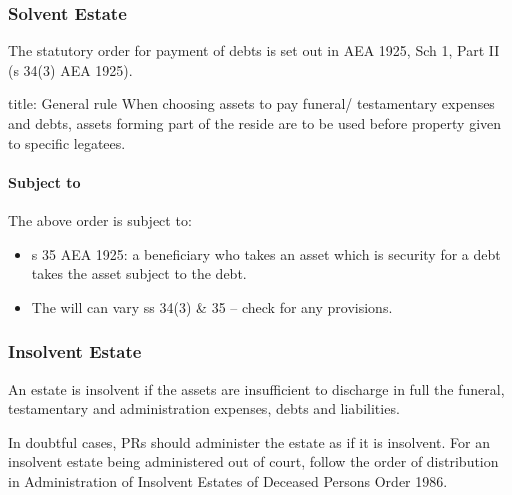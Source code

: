 \documentclass[
]{article}
\newenvironment{Shaded}{}{}
\newcommand{\NormalTok}[1]{#1}
\providecommand{\tightlist}{%
  \setlength{\itemsep}{0pt}\setlength{\parskip}{0pt}}
\begin{document}
\hypertarget{solvent-estate}{%
\subsubsection{Solvent Estate}\label{solvent-estate}}

The statutory order for payment of debts is set out in AEA 1925, Sch 1,
Part II (s 34(3) AEA 1925).

\begin{Shaded}
\begin{Highlighting}[]
\NormalTok{title: General rule}
\NormalTok{When choosing assets to pay funeral/ testamentary expenses and debts, assets forming part of the reside are to be used before property given to specific legatees. }
\end{Highlighting}
\end{Shaded}

\hypertarget{subject-to}{%
\paragraph{Subject to}\label{subject-to}}

The above order is subject to:

\begin{itemize}
\tightlist
\item
  s 35 AEA 1925: a beneficiary who takes an asset which is security for
  a debt takes the asset subject to the debt.
\item
  The will can vary ss 34(3) \& 35 -- check for any provisions.
\end{itemize}

\hypertarget{insolvent-estate}{%
\subsubsection{Insolvent Estate}\label{insolvent-estate}}

\begin{Shaded}
\begin{Highlighting}[]
\NormalTok{An estate is insolvent if the assets are insufficient to discharge in full the funeral, testamentary and administration expenses, debts and liabilities.}
\end{Highlighting}
\end{Shaded}

In doubtful cases, PRs should administer the estate as if it is
insolvent. For an insolvent estate being administered out of court,
follow the order of distribution in Administration of Insolvent Estates
of Deceased Persons Order 1986.
\end{document}
